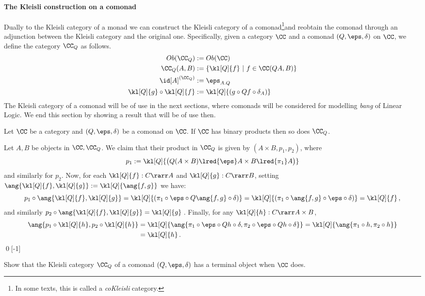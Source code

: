 \documentclass{svmult}
\begin{document}
\paragraph{The Kleisli construction on a comonad}
Dually to the Kleisli category of a monad we can construct the Kleisli category of a comonad\footnote{In some texts, this is called a \emph{coKleisli}
category.}\HY and reobtain the comonad through an adjunction between the Kleisli category and the original one. Specifically, given a category $\CC$
and a comonad $(Q,\eps,\delta)$ on $\CC$, we define the category $\CC_Q$ as follows.
\begin{align*}
Ob(\CC_Q) &:= Ob(\CC) \\
\CC_Q(A,B)&:= \{ \kl[Q]{f}\ |\ f\in\CC(QA,B) \} \\
\id[A]^{(\CC_Q)} &:= \eps_{A.Q} \\
\kl[Q]{g}\circ\kl[Q]{f} &:= \kl[Q]{(g\circ Qf\circ\delta_A)}
\end{align*}
%
The Kleisli category of a comonad will be of use in the next sections, where comonads will be considered for modelling \emph{bang} of Linear Logic. We
end this section by showing a result that will be of use then.
%
\begin{myproposition}\label{p:Qprods}
Let $\CC$ be a category and $(Q,\eps,\delta)$ be a comonad on $\CC$. If $\CC$ has binary products then so does $\CC_Q$.
\end{myproposition}
\proof%
Let $A,B$ be objects in $\CC,\CC_Q$. We claim that their product in $\CC_Q$ is given by $(A\times B,p_1,p_2)$, where
\[ p_1:=\kl[Q]{\big(Q(A\times B)\lred{\eps}A\times B\lred{\pi_1}A\big)} \]
and similarly for $p_2$. Now, for each $\kl[Q]{f}:C\rarr A$ and $\kl[Q]{g}:C\rarr B$, setting $\ang{\kl[Q]{f},\kl[Q]{g}}:=\kl[Q]{\ang{f,g}}$ we have:
\[
 p_1\circ\ang{\kl[Q]{f},\kl[Q]{g}} = \kl[Q]{(\pi_1\circ\eps\circ Q\ang{f,g}\circ\delta)} = \kl[Q]{(\pi_1\circ
 \ang{f,g}\circ\eps\circ\delta)}=\kl[Q]{f}\,,
\]
and similarly $p_2\circ\ang{\kl[Q]{f},\kl[Q]{g}} =\kl[Q]{g}$\,. Finally, for any $\kl[Q]{h}:C\rarr A\times B$,
\begin{align*}
 \ang{p_1\circ\kl[Q]{h},p_2\circ\kl[Q]{h}} &= \kl[Q]{\ang{\pi_1\circ\eps\circ Qh\circ\delta,\pi_2\circ\eps\circ Qh\circ\delta}}
    = \kl[Q]{\ang{\pi_1\circ h,\pi_2\circ h}}\\ &= \kl[Q]{h}\,.
\end{align*}
\qed[-1]

\begin{myexercise}\label{e:Qterms}
Show that the Kleisli category $\CC_Q$ of a comonad $(Q,\eps,\delta)$ has a terminal object when $\CC$ does.
\end{myexercise}
%
\end{document}

